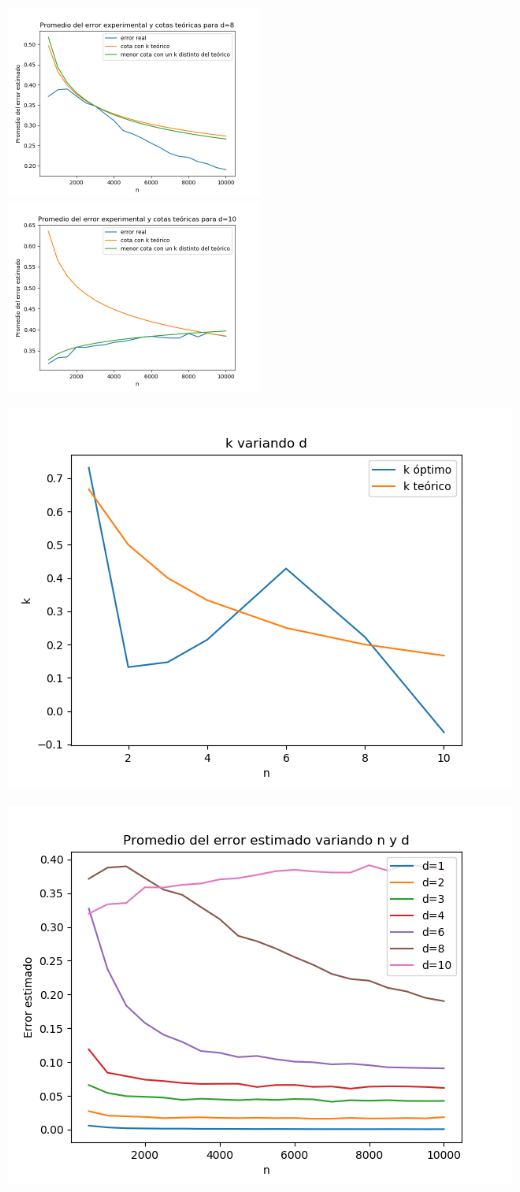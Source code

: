 \documentclass[12pt, a4paper]{article}
\begin{document}
\includegraphics[width=0.5\textwidth]{figuras_h_semidinamico/cotas-error-d=8}
\includegraphics[width=0.5\textwidth]{figuras_h_semidinamico/cotas-error-d=10}

\includegraphics[width=\textwidth]{figuras_h_semidinamico/k-variando-d}

\includegraphics[width=\textwidth]{figuras_h_semidinamico/resultados-grales}
\end{document}

